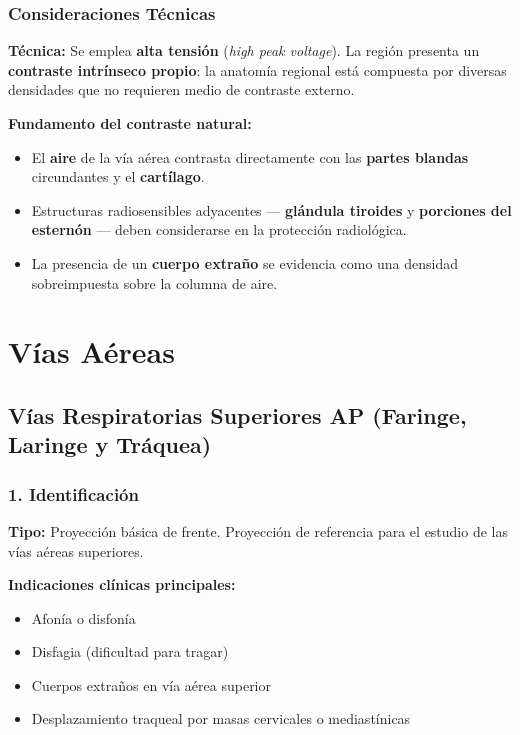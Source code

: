 		\subsubsection*{Consideraciones Técnicas}
		
		\textbf{Técnica:} Se emplea \textbf{alta tensión} (\textit{high peak voltage}). La región presenta un \textbf{contraste intrínseco propio}: la anatomía regional está compuesta por diversas densidades que no requieren medio de contraste externo.
		
		\textbf{Fundamento del contraste natural:}
		\begin{itemize}
			\item El \textbf{aire} de la vía aérea contrasta directamente con las \textbf{partes blandas} circundantes y el \textbf{cartílago}.
			\item Estructuras radiosensibles adyacentes --- \textbf{glándula tiroides} y \textbf{porciones del esternón} --- deben considerarse en la protección radiológica.
			\item La presencia de un \textbf{cuerpo extraño} se evidencia como una densidad sobreimpuesta sobre la columna de aire.
		\end{itemize}
		
		\clearpage
	
	\twocolumn
		
	
	\section{Vías Aéreas}
	
	\subsection{Vías Respiratorias Superiores AP
		(Faringe, Laringe y Tráquea)}
	
	\subsubsection*{1. Identificación}
	
	\textbf{Tipo:} Proyección básica de frente. Proyección de referencia para el estudio de las vías aéreas superiores.
	
	\textbf{Indicaciones clínicas principales:}
	\begin{itemize}
		\item Afonía o disfonía
		\item Disfagia (dificultad para tragar)
		\item Cuerpos extraños en vía aérea superior
		\item Desplazamiento traqueal por masas cervicales o mediastínicas
	\end{itemize}
	
